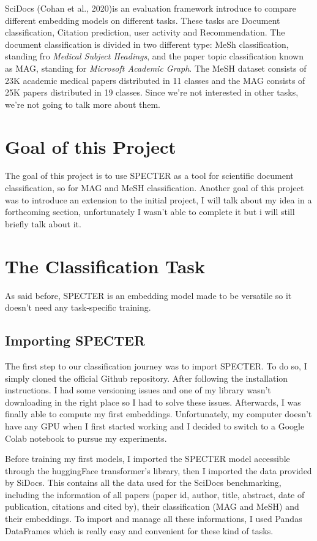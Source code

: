 \documentclass[conference]{IEEEtran}
\begin{document}
SciDocs (Cohan et al., 2020\cite{b1})is an evaluation framework introduce to compare different embedding models on different tasks. These tasks are Document classification, Citation prediction, user activity and Recommendation. The document classification is divided in two different type: MeSh classification, standing fro \textit{Medical Subject Headings}, and the paper topic classification known as MAG, standing for \textit{Microsoft Academic Graph}. The MeSH dataset consists of 23K academic medical papers distributed in 11 classes and the MAG consists of 25K papers distributed in 19 classes.
Since we're not interested in other tasks, we're not going to talk more about them.

\section{Goal of this Project}

The goal of this project is to use SPECTER as a tool for scientific document classification, so for MAG and MeSH classification. Another goal of this project was to introduce an extension to the initial project, I will talk about my idea in a forthcoming section, unfortunately I wasn't able to complete it but i will still briefly talk about it.

\section{The Classification Task}

As said before, SPECTER is an embedding model made to be versatile so it doesn't need any task-specific training.

\subsection{Importing SPECTER}

The first step to our classification journey was to import SPECTER. To do so, I simply cloned the official Github repository. After following the installation instructions. I had some versioning issues and one of my library wasn't downloading in the right place so I had to solve these issues. Afterwards, I was finally able to compute my first embeddings. Unfortunately, my computer doesn't have any GPU when I first started working and I decided to switch to a Google Colab notebook to pursue my experiments.

Before training my first models, I imported the SPECTER model accessible through the huggingFace transformer's library, then I imported the data provided by SiDocs. This contains all the data used for the SciDocs benchmarking, including the information of all papers (paper id, author, title, abstract, date of publication, citations and cited by), their classification (MAG and MeSH) and their embeddings. To import and manage all these informations, I used Pandas DataFrames which is really easy and convenient for these kind of tasks.
\end{document}
